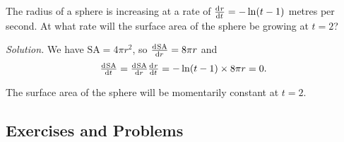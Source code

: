 \begin{ex}
  The radius of a sphere is increasing at a rate of $ \od{r}{t} = -\ln(t - 1) $ metres per second. At what rate will the surface area of
  the sphere be growing at $ t = 2 $?

  \textit{Solution.} We have $ \mathrm{SA} = 4\pi r^2 $, so $ \od{\mathrm{SA}}{r} = 8\pi r $ and
    \begin{displaymath}
      \od{\mathrm{SA}}{t} = \od{\mathrm{SA}}{r} \od{r}{t} = -\ln(t - 1) \times 8\pi r = 0.
    \end{displaymath}

    The surface area of the sphere will be momentarily constant at $ t = 2 $.
\end{ex}

\subsection{Exercises and Problems}
